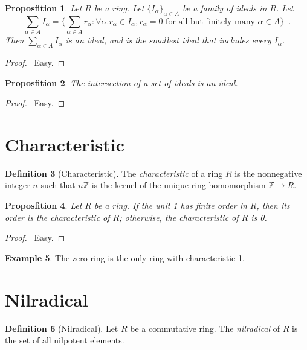 \documentclass{book}
\let\qed\relax
\newtheorem{prop}{Proposfition}[chapter]
\theoremstyle{definition}
\newtheorem{df}[prop]{Definition}
\newtheorem{ex}[prop]{Example}
\begin{document}
\begin{prop}
Let $R$ be a ring. Let $\{I_\alpha\}_{\alpha \in A}$ be a family of ideals in $R$. Let
\[ \sum_{\alpha \in A} I_\alpha = \{ \sum_{\alpha \in A} r_\alpha : \forall \alpha. r_\alpha \in I_\alpha, r_\alpha = 0 \text{ for all but finitely many } \alpha \in A \}\enspace . \]
Then $\sum_{\alpha \in A} I_\alpha$ is an ideal, and is the smallest ideal that includes every $I_\alpha$.
\end{prop}

\begin{proof}
\pf\ Easy. \qed
\end{proof}

\begin{prop}
The intersection of a set of ideals is an ideal.
\end{prop}

\begin{proof}
\pf\ Easy. \qed
\end{proof}

\section{Characteristic}

\begin{df}[Characteristic]
The \emph{characteristic} of a ring $R$ is the nonnegative integer $n$ such that $n \mathbb{Z}$ is the kernel of the unique ring homomorphism $\mathbb{Z} \rightarrow R$.
\end{df}

\begin{prop}
Let $R$ be a ring.
If the unit 1 has finite order in $R$, then its order is the characteristic of $R$; otherwise, the characteristic of $R$ is 0.
\end{prop}

\begin{proof}
\pf\ Easy. \qed
\end{proof}

\begin{ex}
The zero ring is the only ring with characteristic 1.
\end{ex}

\section{Nilradical}

\begin{df}[Nilradical]
Let $R$ be a commutative ring. The \emph{nilradical} of $R$ is the set of all nilpotent elements.
\end{df}
\end{document}
